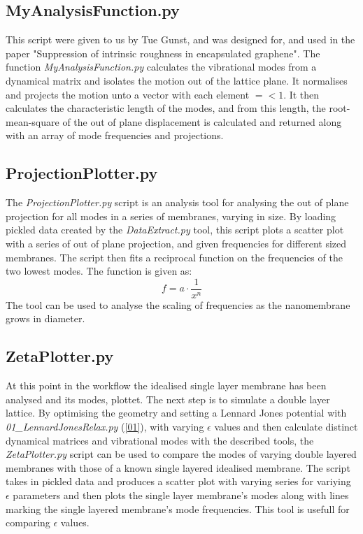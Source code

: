 \subsection{MyAnalysisFunction.py}\label{MAF}
This script were given to us by Tue Gunst, and was designed for, and used in the paper "Suppression of intrinsic roughness in encapsulated graphene"\cite{Thomsen2017}.
The function \textit{MyAnalysisFunction.py} calculates the vibrational modes from a dynamical matrix and isolates the motion out of the lattice plane. It normalises and projects the motion unto a vector with each element $=< 1$. It then calculates the characteristic length of the modes, and from this length, the root-mean-square of the out of plane displacement is calculated and returned along with an array of mode frequencies and projections.
\subsection{ProjectionPlotter.py}
The \textit{ProjectionPlotter.py} script is an analysis tool for analysing the out of plane projection for all modes in a series of membranes, varying in size. By loading pickled data created by the \textit{DataExtract.py} tool, this script plots a scatter plot with a series of out of plane projection, and given frequencies for different sized membranes. The script then fits a reciprocal function on the frequencies of the two lowest modes.
The function is given as:
\begin{equation}
  f = a \cdot \frac{1}{x^n}
\end{equation}
The tool can be used to analyse the scaling of frequencies as the nanomembrane grows in diameter.
\subsection{ZetaPlotter.py}
At this point in the workflow the idealised single layer membrane has been analysed and its modes, plottet. The next step is to simulate a double layer lattice. By optimising the geometry and setting a Lennard Jones potential with \textit{01\_LennardJonesRelax.py} (\cref{01}), with varying $\epsilon$ values and then calculate distinct dynamical matrices and vibrational modes with the described tools, the \textit{ZetaPlotter.py} script can be used to compare the modes of varying double layered membranes with those of a known single layered idealised membrane. The script takes in pickled data and produces a scatter plot with varying series for variying $\epsilon$ parameters and then plots the single layer membrane's modes along with lines marking the single layered membrane's mode frequencies. This tool is usefull for comparing $\epsilon$ values.

